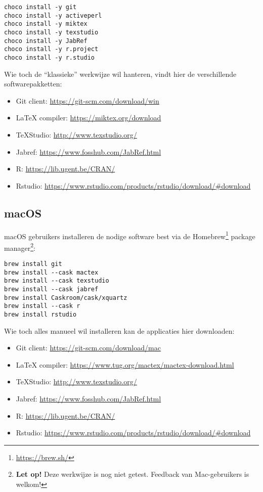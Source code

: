 \begin{verbatim}
choco install -y git
choco install -y activeperl
choco install -y miktex
choco install -y texstudio
choco install -y JabRef
choco install -y r.project
choco install -y r.studio
\end{verbatim}

Wie toch de ``klassieke'' werkwijze wil hanteren, vindt hier de verschillende softwarepakketten:

\begin{itemize}
  \item Git client: \url{https://git-scm.com/download/win}
  \item \LaTeX{} compiler: \url{https://miktex.org/download}
  \item TeXStudio: \url{http://www.texstudio.org/}
  \item Jabref: \url{https://www.fosshub.com/JabRef.html}
  \item R: \url{https://lib.ugent.be/CRAN/}
  \item Rstudio: \url{https://www.rstudio.com/products/rstudio/download/#download}
\end{itemize}

\subsection{macOS}

macOS gebruikers installeren de nodige software best via de Homebrew\footnote{\url{https://brew.sh/}} package manager\footnote{\textbf{Let op!} Deze werkwijze is nog niet getest. Feedback van Mac-gebruikers is welkom!}:

\begin{verbatim}
brew install git
brew install --cask mactex
brew install --cask texstudio
brew install --cask jabref
brew install Caskroom/cask/xquartz
brew install --cask r
brew install rstudio
\end{verbatim}

Wie toch alles manueel wil installeren kan de applicaties hier downloaden:

\begin{itemize}
  \item Git client: \url{https://git-scm.com/download/mac}
  \item \LaTeX{} compiler: \url{https://www.tug.org/mactex/mactex-download.html}
  \item TeXStudio: \url{http://www.texstudio.org/}
  \item Jabref: \url{https://www.fosshub.com/JabRef.html}
  \item R: \url{https://lib.ugent.be/CRAN/}
  \item Rstudio: \url{https://www.rstudio.com/products/rstudio/download/#download}
\end{itemize}

